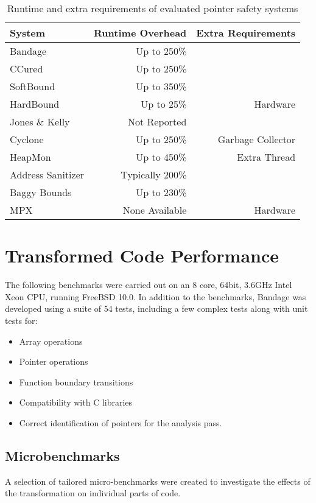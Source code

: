 \begin{table}
\centering
\begin{tabular}{l|r|r}
System & Runtime Overhead & Extra Requirements \\
\hline
Bandage             &Up to 250\%&\\
CCured              &Up to 250\%&\\
SoftBound           &Up to 350\%&\\
HardBound           &Up to 25\%&Hardware\\
Jones \& Kelly      &Not Reported&\\
Cyclone             &Up to 250\%&Garbage Collector\\
HeapMon             &Up to 450\%&Extra Thread\\
Address Sanitizer   &Typically 200\%&\\
Baggy Bounds        &Up to 230\%&\\
MPX                 &None Available&Hardware\\
\end{tabular}
\caption{Runtime and extra requirements of evaluated pointer safety systems}
\label{fig:Others}
\end{table}

\section{Transformed Code Performance}

The following benchmarks were carried out on an 8 core, 64bit, 3.6GHz Intel Xeon CPU, running FreeBSD 10.0.
In addition to the benchmarks, Bandage was developed using a suite of 54 tests, including a few complex tests along with unit tests for:

\begin{itemize}
\item Array operations
\item Pointer operations
\item Function boundary transitions
\item Compatibility with C libraries
\item Correct identification of pointers for the analysis pass.
\end{itemize}

\subsection{Microbenchmarks}

A selection of tailored micro-benchmarks were created to investigate the effects of the transformation on individual parts of code.

